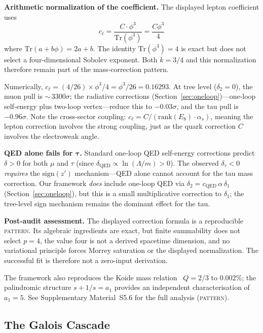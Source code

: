 \documentclass[12pt,a4paper]{article}
\theoremstyle{definition}
\begin{document}
\textbf{Arithmetic normalization of the coefficient.} The displayed lepton coefficient uses
\begin{equation}
\boxed{c_\ell = \frac{C \cdot \phi^3}{\mathrm{Tr}(\phi^3)} = \frac{C \phi^3}{4}}
\label{eq:cell}
\end{equation}
where $\mathrm{Tr}(a+b\phi)=2a+b$.  The identity $\mathrm{Tr}(\phi^3)=4$ is exact but does not select a four-dimensional Sobolev exponent.  Both $k=3/4$ and this normalization therefore remain part of the mass-correction pattern.

Numerically, $c_\ell = (4/26) \times \phi^3 / 4 = \phi^3/26 = 0.16293$.  At tree level ($\delta_2 = 0$), the muon pull is ${\sim}\,3300\sigma$; the radiative corrections (Section~\ref{sec:oneloop})---one-loop self-energy plus two-loop vertex---reduce this to $-0.03\sigma$, and the tau pull is $-0.96\sigma$.  Note the cross-sector coupling: $c_\ell = C/(\mathrm{rank}(E_8) \cdot \alpha_s)$, meaning the lepton correction involves the strong coupling, just as the quark correction $C$ involves the electroweak angle.

\textbf{QED alone fails for $\boldsymbol{\tau}$.} Standard one-loop QED self-energy corrections predict $\delta > 0$ for both $\mu$ and $\tau$ (since $\delta_{\text{QED}} \propto \ln(\Lambda/m) > 0$). The observed $\delta_\tau < 0$ \emph{requires} the $\mathrm{sign}(z')$ mechanism---QED alone cannot account for the tau mass correction.  Our framework \emph{does} include one-loop QED via $\delta_2 = c_{\text{QED}}\,\alpha\,\delta_1$ (Section~\ref{sec:oneloop}), but this is a small multiplicative correction to $\delta_1$; the tree-level sign mechanism remains the dominant effect for the tau.

\textbf{Post-audit assessment.}  The displayed correction formula is a reproducible \textsc{pattern}.  Its algebraic ingredients are exact, but finite summability does not select $p=4$, the value four is not a derived spacetime dimension, and no variational principle forces Morrey saturation or the displayed normalization.  The successful fit is therefore not a zero-input derivation.

The framework also reproduces the Koide mass relation~\cite{Koide1983} $Q = 2/3$ to $0.002\%$; the palindromic structure $s + 1/s = a_1$ provides an independent characterisation of $a_1 = 5$.  See Supplementary Material~S5.6 for the full analysis (\textsc{pattern}).

\subsection{The Galois Cascade}
\label{sec:galois_cascade}
\end{document}
